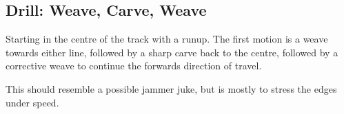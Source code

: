 \subsection*{Drill: Weave, Carve, Weave}
\label{drill:footwork/weave_carve_weave}

Starting in the centre of the track with a runup.
The first motion is a weave towards either line, followed by a sharp carve back to the centre, followed by a corrective weave to continue the forwards direction of travel.  

This should resemble a possible jammer juke, but is mostly to stress the edges under speed. 

